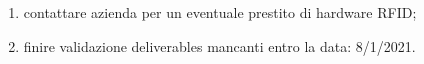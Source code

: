 \begin{enumerate}
    \item contattare azienda per un eventuale prestito di hardware RFID;
    \item finire validazione deliverables mancanti entro la data: 8/1/2021.
\end{enumerate}